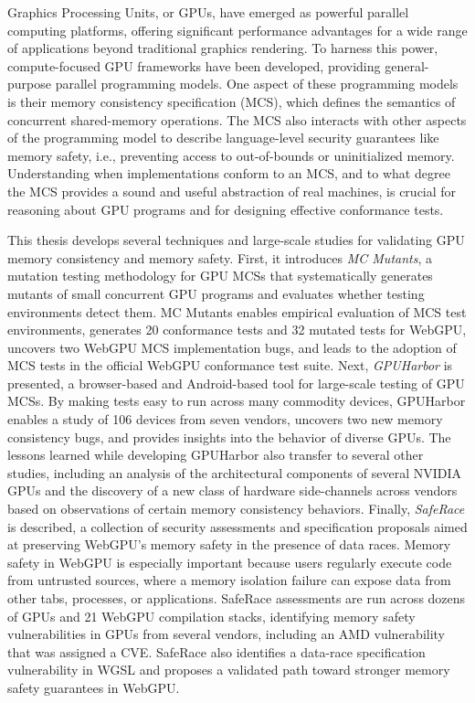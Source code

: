 
Graphics Processing Units, or GPUs, have emerged as powerful parallel computing platforms, offering significant performance advantages for a wide range of applications beyond traditional graphics rendering. To harness this power, compute-focused GPU frameworks have been developed, providing general-purpose parallel programming models. One aspect of these programming models is their memory consistency specification (MCS), which defines the semantics of concurrent shared-memory operations. The MCS also interacts with other aspects of the programming model to describe language-level security guarantees like memory safety, i.e., preventing access to out-of-bounds or uninitialized memory. Understanding when implementations conform to an MCS, and to what degree the MCS provides a sound and useful abstraction of real machines, is crucial for reasoning about GPU programs and for designing effective conformance tests.

This thesis develops several techniques and large-scale studies for validating GPU memory consistency and memory safety. First, it introduces \textit{MC Mutants}, a mutation testing methodology for GPU MCSs that systematically generates mutants of small concurrent GPU programs and evaluates whether testing environments detect them. MC Mutants enables empirical evaluation of MCS test environments, generates 20 conformance tests and 32 mutated tests for WebGPU, uncovers two WebGPU MCS implementation bugs, and leads to the adoption of MCS tests in the official WebGPU conformance test suite. Next, \textit{GPUHarbor} is presented, a browser-based and Android-based tool for large-scale testing of GPU MCSs. By making tests easy to run across many commodity devices, GPUHarbor enables a study of 106 devices from seven vendors, uncovers two new memory consistency bugs, and provides insights into the behavior of diverse GPUs. The lessons learned while developing GPUHarbor also transfer to several other studies, including an analysis of the architectural components of several NVIDIA GPUs and the discovery of a new class of hardware side-channels across vendors based on observations of certain memory consistency behaviors. Finally, \textit{SafeRace} is described, a collection of security assessments and specification proposals aimed at preserving WebGPU's memory safety in the presence of data races. Memory safety in WebGPU is especially important because users regularly execute code from untrusted sources, where a memory isolation failure can expose data from other tabs, processes, or applications. SafeRace assessments are run across dozens of GPUs and 21 WebGPU compilation stacks, identifying memory safety vulnerabilities in GPUs from several vendors, including an AMD vulnerability that was assigned a CVE. SafeRace also identifies a data-race specification vulnerability in WGSL and proposes a validated path toward stronger memory safety guarantees in WebGPU.
